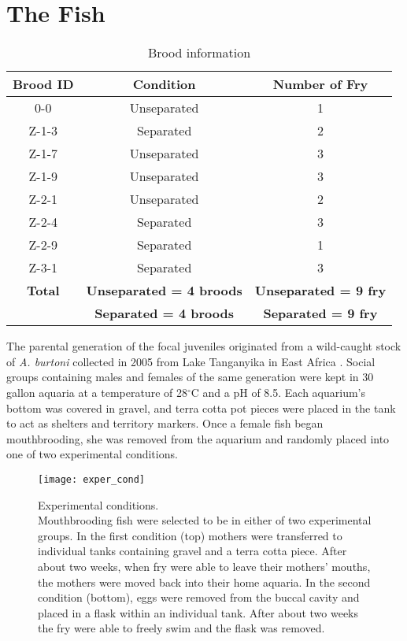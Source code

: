\documentclass[12pt,twoside]{reedthesis}
\begin{document}
\section{The Fish}
\begin{table}[htbp]
\caption[Brood information]{Brood information}
\begin{center}
\footnotesize
\begin{tabular}{ | c | c | c |}
\hline
\textbf{Brood ID} & \textbf{Condition} & \textbf{Number of Fry}\\
\hline
0-0 & Unseparated & 1\\
\hline
Z-1-3 & Separated & 2\\
  \hline
  Z-1-7 & Unseparated & 3\\
  \hline
Z-1-9 & Unseparated & 3\\
\hline
Z-2-1 & Unseparated & 2 \\
  \hline
Z-2-4 & Separated & 3 \\
\hline
Z-2-9 & Separated & 1 \\
\hline
Z-3-1 & Separated & 3 \\
  \hline
  \textbf{Total} & \textbf{Unseparated = 4 broods} & \textbf{Unseparated = 9 fry}\\
  & \textbf{Separated = 4 broods} & \textbf{Separated = 9 fry}\\
  \hline
\end{tabular}
\end{center}
\end{table}


The parental generation of the focal juveniles originated from a wild-caught
stock of \textit{A. burtoni} collected in 2005 from Lake Tanganyika in East
Africa \citep{renn_maternal_2009}.
Social groups containing males and females of the same generation were kept in
30 gallon aquaria at a temperature of 28$^\circ$C and a pH of 8.5. Each aquarium's bottom
was covered in gravel, and terra cotta pot pieces were placed in the tank to act
as shelters and territory markers. Once a female fish began mouthbrooding, she
was removed from the aquarium and randomly placed into one of two experimental
conditions.

\begin{figure}[htbp] 
\begin{centering} 
\texttt{[image: exper\_cond]}
\caption[Experimental conditions]{\footnotesize{Experimental conditions.\\
    Mouthbrooding fish were selected to be in either of two experimental groups.
  In the first condition (top) mothers were transferred to individual tanks
  containing gravel and a terra cotta piece. After about two weeks, when fry were
able to leave their mothers' mouths, the mothers were moved back into their home
aquaria. In the second condition (bottom), eggs were removed from the buccal
cavity and placed in a flask within an individual tank. After about two weeks
the fry were able to freely swim and the flask was removed.}} 
\label{subd}
\end{centering} 
\end{figure}
\end{document}
